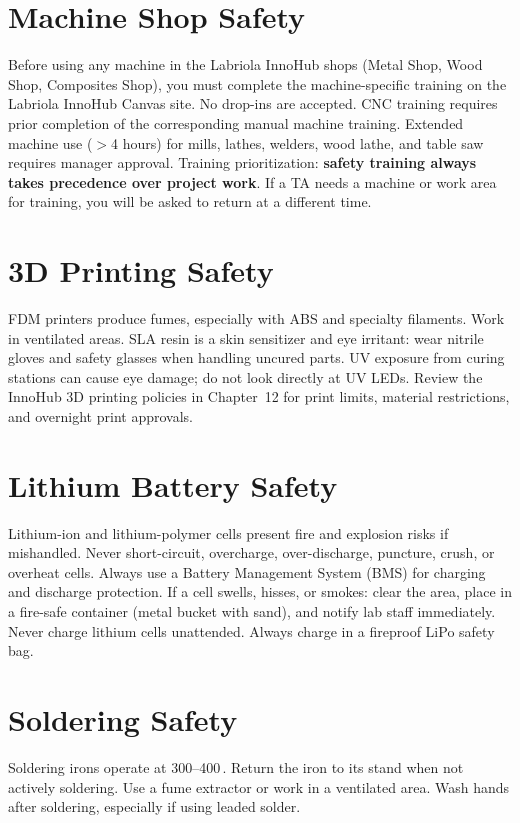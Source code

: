 \section*{Machine Shop Safety}
Before using any machine in the Labriola InnoHub shops (Metal Shop, Wood Shop, Composites Shop), you must complete the machine-specific training on the Labriola InnoHub Canvas site. No drop-ins are accepted. CNC training requires prior completion of the corresponding manual machine training. Extended machine use ($>$4 hours) for mills, lathes, welders, wood lathe, and table saw requires manager approval. Training prioritization: \textbf{safety training always takes precedence over project work}. If a TA needs a machine or work area for training, you will be asked to return at a different time.

\section*{3D Printing Safety}
FDM printers produce fumes, especially with ABS and specialty filaments. Work in ventilated areas. SLA resin is a skin sensitizer and eye irritant: wear nitrile gloves and safety glasses when handling uncured parts. UV exposure from curing stations can cause eye damage; do not look directly at UV LEDs. Review the InnoHub 3D printing policies in Chapter~12 for print limits, material restrictions, and overnight print approvals.

\section*{Lithium Battery Safety}
Lithium-ion and lithium-polymer cells present fire and explosion risks if mishandled. Never short-circuit, overcharge, over-discharge, puncture, crush, or overheat cells. Always use a Battery Management System (BMS) for charging and discharge protection. If a cell swells, hisses, or smokes: clear the area, place in a fire-safe container (metal bucket with sand), and notify lab staff immediately. Never charge lithium cells unattended. Always charge in a fireproof LiPo safety bag.

\section*{Soldering Safety}
Soldering irons operate at 300--400\,\degC{}. Return the iron to its stand when not actively soldering. Use a fume extractor or work in a ventilated area. Wash hands after soldering, especially if using leaded solder.


